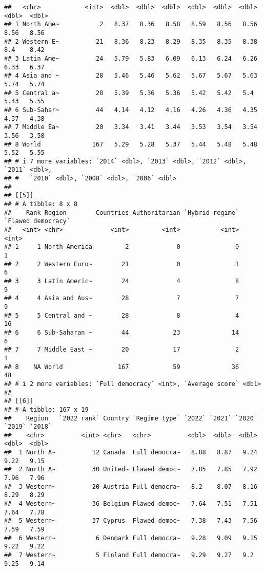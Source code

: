 \documentclass[
]{article}
\begin{document}
\begin{verbatim}
##   <chr>            <int>  <dbl>  <dbl>  <dbl>  <dbl>  <dbl>  <dbl>  <dbl>  <dbl>
## 1 North Ame~           2   8.37   8.36   8.58   8.59   8.56   8.56   8.56   8.56
## 2 Western E~          21   8.36   8.23   8.29   8.35   8.35   8.38   8.4    8.42
## 3 Latin Ame~          24   5.79   5.83   6.09   6.13   6.24   6.26   6.33   6.37
## 4 Asia and ~          28   5.46   5.46   5.62   5.67   5.67   5.63   5.74   5.74
## 5 Central a~          28   5.39   5.36   5.36   5.42   5.42   5.4    5.43   5.55
## 6 Sub-Sahar~          44   4.14   4.12   4.16   4.26   4.36   4.35   4.37   4.38
## 7 Middle Ea~          20   3.34   3.41   3.44   3.53   3.54   3.54   3.56   3.58
## 8 World              167   5.29   5.28   5.37   5.44   5.48   5.48   5.52   5.55
## # i 7 more variables: `2014` <dbl>, `2013` <dbl>, `2012` <dbl>, `2011` <dbl>,
## #   `2010` <dbl>, `2008` <dbl>, `2006` <dbl>
## 
## [[5]]
## # A tibble: 8 x 8
##    Rank Region        Countries Authoritarian `Hybrid regime` `Flawed democracy`
##   <int> <chr>             <int>         <int>           <int>              <int>
## 1     1 North America         2             0               0                  1
## 2     2 Western Euro~        21             0               1                  6
## 3     3 Latin Americ~        24             4               8                  9
## 4     4 Asia and Aus~        28             7               7                  9
## 5     5 Central and ~        28             8               4                 16
## 6     6 Sub-Saharan ~        44            23              14                  6
## 7     7 Middle East ~        20            17               2                  1
## 8    NA World               167            59              36                 48
## # i 2 more variables: `Full democracy` <int>, `Average score` <dbl>
## 
## [[6]]
## # A tibble: 167 x 19
##    Region   `2022 rank` Country `Regime type` `2022` `2021` `2020` `2019` `2018`
##    <chr>          <int> <chr>   <chr>          <dbl>  <dbl>  <dbl>  <dbl>  <dbl>
##  1 North A~          12 Canada  Full democra~   8.88   8.87   9.24   9.22   9.15
##  2 North A~          30 United~ Flawed democ~   7.85   7.85   7.92   7.96   7.96
##  3 Western~          20 Austria Full democra~   8.2    8.07   8.16   8.29   8.29
##  4 Western~          36 Belgium Flawed democ~   7.64   7.51   7.51   7.64   7.78
##  5 Western~          37 Cyprus  Flawed democ~   7.38   7.43   7.56   7.59   7.59
##  6 Western~           6 Denmark Full democra~   9.28   9.09   9.15   9.22   9.22
##  7 Western~           5 Finland Full democra~   9.29   9.27   9.2    9.25   9.14

\end{verbatim}
\end{document}
